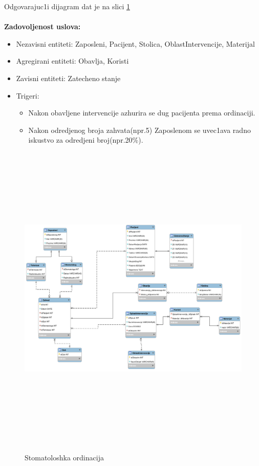 \documentclass[10 pt]{article}
\begin{document}
Odgovarajuc1i dijagram dat je na slici \ref{fig:dijagram}
\\
\\
\textbf{Zadovoljenost uslova:}
\begin{itemize}
	\item Nezavisni entiteti: Zaposleni, Pacijent, Stolica, OblastIntervencije, Materijal
	\item Agregirani entiteti: Obavlja, Koristi
	\item Zavisni entiteti: Zatecheno stanje
	\item Trigeri: 
		\begin{itemize}
			\item Nakon obavljene intervencije azhurira se dug pacijenta prema ordinaciji.
			\item Nakon odredjenog broja zahvata(npr.5) Zaposlenom se uvec1ava radno iskustvo za odredjeni broj(npr.20\%). 
		\end{itemize}	
\end{itemize}

\begin{figure}[H]
	\centering
	\includegraphics[width=15cm,height=15cm,keepaspectratio]{StomatoloskaOrdinacija.png}\\
	\caption{Stomatoloshka ordinacija \label{fig:dijagram}}
\end{figure}
\end{document}
